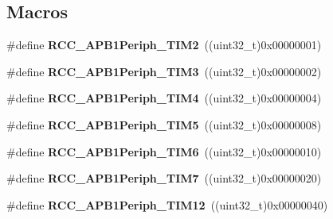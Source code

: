 \subsection*{Macros}
\begin{DoxyCompactItemize}
\item 
\mbox{\label{group___r_c_c___a_p_b1___peripherals_ga742bab2f04cebe587574b53f7107aeaf}} 
\#define {\bfseries R\+C\+C\+\_\+\+A\+P\+B1\+Periph\+\_\+\+T\+I\+M2}~((uint32\+\_\+t)0x00000001)
\item 
\mbox{\label{group___r_c_c___a_p_b1___peripherals_gad4454f63a511a256e55aad55c03beb76}} 
\#define {\bfseries R\+C\+C\+\_\+\+A\+P\+B1\+Periph\+\_\+\+T\+I\+M3}~((uint32\+\_\+t)0x00000002)
\item 
\mbox{\label{group___r_c_c___a_p_b1___peripherals_ga80f9f3720804a97210b723696bd94d83}} 
\#define {\bfseries R\+C\+C\+\_\+\+A\+P\+B1\+Periph\+\_\+\+T\+I\+M4}~((uint32\+\_\+t)0x00000004)
\item 
\mbox{\label{group___r_c_c___a_p_b1___peripherals_ga4905c26000a571fa01fc057fe31d254a}} 
\#define {\bfseries R\+C\+C\+\_\+\+A\+P\+B1\+Periph\+\_\+\+T\+I\+M5}~((uint32\+\_\+t)0x00000008)
\item 
\mbox{\label{group___r_c_c___a_p_b1___peripherals_ga4974e8b8f11d54fbc0bac1988ff6254c}} 
\#define {\bfseries R\+C\+C\+\_\+\+A\+P\+B1\+Periph\+\_\+\+T\+I\+M6}~((uint32\+\_\+t)0x00000010)
\item 
\mbox{\label{group___r_c_c___a_p_b1___peripherals_ga9415b0c46db5318bdee3f868c16b8d35}} 
\#define {\bfseries R\+C\+C\+\_\+\+A\+P\+B1\+Periph\+\_\+\+T\+I\+M7}~((uint32\+\_\+t)0x00000020)
\item 
\mbox{\label{group___r_c_c___a_p_b1___peripherals_ga0a4ec40233160ca20adaa571073e7bcd}} 
\#define {\bfseries R\+C\+C\+\_\+\+A\+P\+B1\+Periph\+\_\+\+T\+I\+M12}~((uint32\+\_\+t)0x00000040)
\item 
\mbox{\label{group___r_c_c___a_p_b1___peripherals_ga34397b722f46f31e898136fb51a7523a}} 

\end{DoxyCompactItemize}
